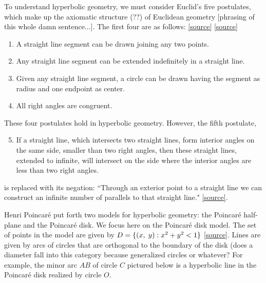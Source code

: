 \documentclass[12pt]{article}
\newcommand{\poincare}{Poincar\'{e} }
\newcommand{\ttc}{, \hspace{1mm}}
\theoremstyle{plain}
\theoremstyle{definition}
\begin{document}
To understand hyperbolic geometry, we must consider Euclid's five postulates, which make up the axiomatic structure (??) of Euclidean geometry [phrasing of this whole damn sentence...]. The first four are as follows: \href{http://mathworld.wolfram.com/EuclidsPostulates.html}{[source]} [\href{https://pdfs.semanticscholar.org/ed0e/d1fee9bbe60b24be373ac1207d17ecb90b4a.pdf}{source}]
\begin{enumerate}[leftmargin = 4em, itemsep=-.8em]
	\item A straight line segment can be drawn joining any two points.
	\item Any straight line segment can be extended indefinitely in a straight line.
	\item Given any straight line segment, a circle can be drawn having the segment as radius and one endpoint as center.
	\item All right angles are congruent.
\end{enumerate}
These four postulates hold in hyperbolic geometry. However, the fifth postulate, 
\begin{enumerate}[leftmargin = 4em, itemsep=-1em]
	\setcounter{enumi}{4}
	\item If a straight line, which intersects two straight lines, form interior angles on the same side, smaller than two right angles, then these straight lines, extended to infinite, will intersect on the side where the interior angles are less than two right angles.
\end{enumerate}
is replaced with its negation: ``Through an exterior point to a straight line we can construct an infinite number of parallels to that straight line." \href{https://pdfs.semanticscholar.org/ed0e/d1fee9bbe60b24be373ac1207d17ecb90b4a.pdf}{[source]}.



Henri \poincare put forth two models for hyperbolic geometry: the \poincare half-plane and the \poincare disk. We focus here on the \poincare disk model. The set of points in the model are given by $D = \{(x\ttc y): x^2 + y^2 < 1\}$ \href{http://math2.uncc.edu/~frothe/3181alllhyp1_7.pdf}{[source]}. Lines are given by arcs of circles that are orthogonal to the boundary of the disk (does a diameter fall into this category because generalized circles or whatever? For example, the minor arc $AB$ of circle $C$ pictured below is a hyperbolic line in the \poincare disk realized by circle $O$.

	
\end{document}
